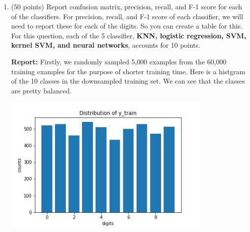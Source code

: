 \documentclass[twoside,10pt]{article}
\begin{document}
\begin{enumerate}
\begin{enumerate}
	\item (50 points) Report confusion matrix, precision, recall, and F-1 score for each of the classifiers. For precision, recall, and F-1 score of each classifier, we will  need to report these for each of the digits. So you can create a table for this. For this question, each of the 5 classifier, {\bf KNN, logistic regression, SVM, kernel SVM, and  neural networks}, accounts for 10 points.
\begin{tcolorbox}
\textbf{Report:}
Firstly, we randomly sampled 5,000 examples from the 60,000 training examples for the purpose of shorter training time. Here is a histgram of the 10 classes in the downsampled training set. We can see that the classes are pretty balanced.\\
\begin{center}
\includegraphics[width=0.8\textwidth]{images/y_train.jpg}
\end{center}


\end{tcolorbox}
\end{enumerate}
\end{enumerate}
\end{document}
